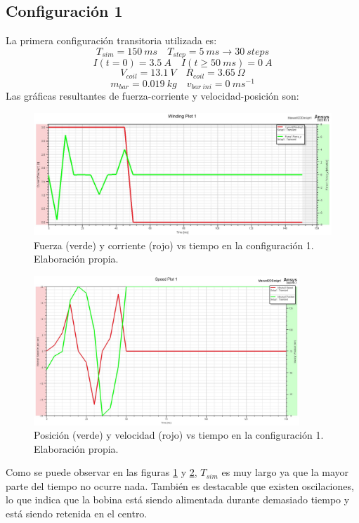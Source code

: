 \subsection*{Configuración 1}
La primera configuración transitoria utilizada es:
\[
T_{sim}=150~ms \quad T_{step}=5~ms \to 30~steps
\]
\[
I(t=0)=3.5~A \quad I(t\geq 50~ms)=0~A
\]
\[
V_{coil}=13.1~V \quad R_{coil}=3.65~\Omega
\]
\[
m_{bar}=0.019~kg \quad v_{bar~ini}=0~ms^{-1}
\]
Las gráficas resultantes de fuerza-corriente y velocidad-posición son:
\begin{figure}[H]
    \centering
    \includegraphics[width=13cm]{FigurasMemoria/S1CurrentForce.jpg}
    \caption{Fuerza (verde) y corriente (rojo) vs tiempo en la configuración 1. Elaboración propia.}
    \label{fig:S1CurrentForce} %
\end{figure}
\begin{figure}[H]
    \centering
    \includegraphics[width=10cm]{FigurasMemoria/S1SpeedPosition.jpg}
    \caption{Posición (verde) y velocidad (rojo) vs tiempo en la configuración 1. Elaboración propia.}
    \label{fig:S1SpeedPosition} %
\end{figure}
Como se puede observar en las figuras \ref{fig:S1CurrentForce} y \ref{fig:S1SpeedPosition}, \(T_{sim}\) es muy largo ya que la mayor parte del tiempo no ocurre nada. También es destacable que existen oscilaciones, lo que indica que la bobina está siendo alimentada durante demasiado tiempo y está siendo retenida en el centro.


